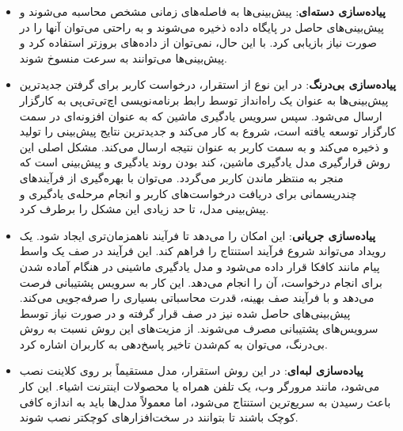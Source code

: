 \begin{itemize}

\item \textbf{پیاده‌سازی دسته‌ای}: پیش‌بینی‌ها به فاصله‌های زمانی مشخص محاسبه می‌شوند و پیش‌بینی‌های حاصل در پایگاه داده ذخیره می‌شوند و به راحتی می‌توان آنها را در صورت نیاز بازیابی کرد. با این حال، نمی‌توان از داده‌های بروزتر استفاده کرد و پیش‌بینی‌ها می‌توانند به سرعت منسوخ شوند\cite{singh2021deploy, pacheco2018towards}.

\item \textbf{پیاده‌سازی بی‌درنگ}: در این نوع از استقرار، درخواست کاربر برای گرفتن جدید‌ترین پیش‌بینی‌ها به عنوان یک راه‌انداز توسط رابط برنامه‌نویسی اچ‌تی‌تی‌پی به کارگزار ارسال می‌شود. سپس سرویس یادگیری ماشین که به عنوان افزونه‌ای در سمت کارگزار توسعه یافته است، شروع به کار می‌کند و جدیدترین نتایج پیش‌بینی را تولید و ذخیره می‌کند و به سمت کاربر به عنوان نتیجه ارسال می‌کند. مشکل اصلی این روش قرارگیری مدل یادگیری ماشین، کند بودن روند یادگیری و پیش‌بینی است که منجر به منتظر ماندن کاربر می‌گردد. می‌توان با بهره‌گیری از فرآیند‌های چندریسمانی برای دریافت درخواست‌های کاربر و انجام مرحله‌ی یادگیری و پیش‌بینی مدل، تا حد زیادی این مشکل را برطرف کرد\cite{singh2021deploy, pacheco2018towards}.

\item \textbf{پیاده‌سازی جریانی}: این امکان را می‌دهد تا فرآیند ناهمزمان‌تری ایجاد شود. یک رویداد می‌تواند شروع فرآیند استنتاج را فراهم کند. این فرآیند در صف یک واسط پیام مانند کافکا قرار داده می‌شود و مدل یادگیری ماشینی در هنگام آماده شدن برای انجام درخواست، آن را انجام می‌دهد. این کار به سرویس پشتیبانی فرصت می‌دهد و با فرآیند صف بهینه، قدرت محاسباتی بسیاری را صرفه‌جویی می‌کند. پیش‌بینی‌های حاصل شده نیز در صف قرار گرفته و در صورت نیاز توسط سرویس‌های پشتیبانی مصرف می‌شوند. از مزیت‌های این روش نسبت به روش بی‌درنگ، می‌توان به کم‌شدن تاخیر پاسخ‌دهی به کاربران اشاره کرد\cite{singh2021deploy, pacheco2018towards}.

\item \textbf{پیاده‌سازی لبه‌ای}: در این روش استقرار، مدل مستقیماً بر روی کلاینت نصب می‌شود، مانند مرورگر وب، یک تلفن همراه یا محصولات اینترنت اشیاء. این کار باعث رسیدن به سریع‌ترین استنتاج می‌شود، اما معمولاً مدل‌ها باید به اندازه کافی کوچک باشند تا بتوانند در سخت‌افزارهای کوچکتر نصب شوند\cite{kaggleMLdeployments}.

\end{itemize}

